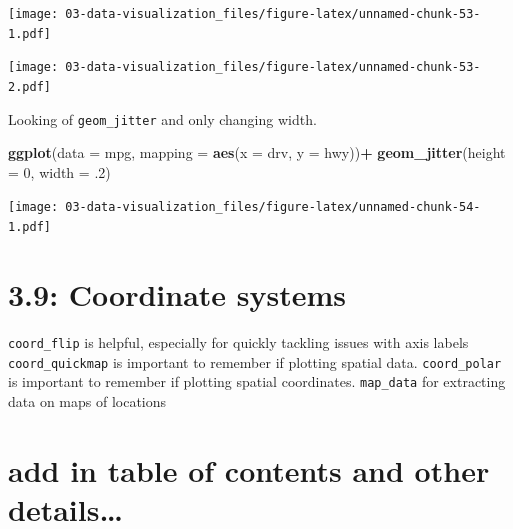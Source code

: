 \documentclass[]{book}
\newenvironment{Shaded}{\begin{snugshade}}{\end{snugshade}}
\newcommand{\DataTypeTok}[1]{\textcolor[rgb]{0.13,0.29,0.53}{#1}}
\newcommand{\DecValTok}[1]{\textcolor[rgb]{0.00,0.00,0.81}{#1}}
\newcommand{\FloatTok}[1]{\textcolor[rgb]{0.00,0.00,0.81}{#1}}
\newcommand{\KeywordTok}[1]{\textcolor[rgb]{0.13,0.29,0.53}{\textbf{#1}}}
\newcommand{\NormalTok}[1]{#1}
\newcommand{\OperatorTok}[1]{\textcolor[rgb]{0.81,0.36,0.00}{\textbf{#1}}}
\newcommand{\StringTok}[1]{\textcolor[rgb]{0.31,0.60,0.02}{#1}}
\theoremstyle{definition}
\theoremstyle{definition}
\theoremstyle{definition}
\theoremstyle{remark}
\begin{document}
\texttt{[image: 03-data-visualization\_files/figure-latex/unnamed-chunk-53-1.pdf]}

\begin{Shaded}
\end{Shaded}

\texttt{[image: 03-data-visualization\_files/figure-latex/unnamed-chunk-53-2.pdf]}

Looking of \texttt{geom\_jitter} and only changing width.

\begin{Shaded}
\begin{Highlighting}[]
\KeywordTok{ggplot}\NormalTok{(}\DataTypeTok{data =}\NormalTok{ mpg, }\DataTypeTok{mapping =} \KeywordTok{aes}\NormalTok{(}\DataTypeTok{x =}\NormalTok{ drv, }\DataTypeTok{y =}\NormalTok{ hwy))}\OperatorTok{+}
\StringTok{  }\KeywordTok{geom_jitter}\NormalTok{(}\DataTypeTok{height =} \DecValTok{0}\NormalTok{, }\DataTypeTok{width =} \FloatTok{.2}\NormalTok{)}
\end{Highlighting}
\end{Shaded}

\texttt{[image: 03-data-visualization\_files/figure-latex/unnamed-chunk-54-1.pdf]}

\hypertarget{coordinate-systems-1}{%
\section{3.9: Coordinate systems}\label{coordinate-systems-1}}

\texttt{coord\_flip} is helpful, especially for quickly tackling issues
with axis labels \texttt{coord\_quickmap} is important to remember if
plotting spatial data. \texttt{coord\_polar} is important to remember if
plotting spatial coordinates. \texttt{map\_data} for extracting data on
maps of locations

\hypertarget{add-in-table-of-contents-and-other-details}{%
\section{add in table of contents and other
details\ldots{}}\label{add-in-table-of-contents-and-other-details}}
\end{document}
